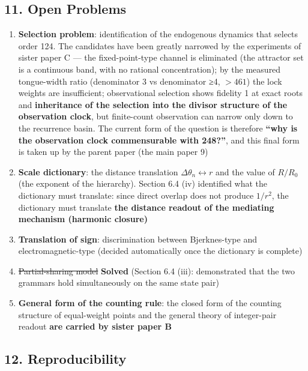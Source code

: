\documentclass[
  a4paper,
]{article}
\providecommand{\tightlist}{%
  \setlength{\itemsep}{0pt}\setlength{\parskip}{0pt}}
\begin{document}
\subsection{11. Open Problems}\label{open-problems}

\begin{enumerate}
\def\labelenumi{\arabic{enumi}.}
\tightlist
\item
  \textbf{Selection problem}: identification of the endogenous dynamics
  that selects order 124. The candidates have been greatly narrowed by
  the experiments of sister paper C --- the fixed-point-type channel is
  eliminated (the attractor set is a continuous band, with no rational
  concentration); by the measured tongue-width ratio (denominator 3 vs
  denominator ≥4, \(>461\)) the lock weights are insufficient;
  observational selection shows fidelity 1 at exact roots and
  \textbf{inheritance of the selection into the divisor structure of the
  observation clock}, but finite-count observation can narrow only down
  to the recurrence basin. The current form of the question is therefore
  \textbf{``why is the observation clock commensurable with 248?''}, and
  this final form is taken up by the parent paper (the main paper 9)
\item
  \textbf{Scale dictionary}: the distance translation
  \(\Delta\theta_n\leftrightarrow r\) and the value of \(R/R_0\) (the
  exponent of the hierarchy). Section 6.4 (iv) identified what the
  dictionary must translate: since direct overlap does not produce
  \(1/r^2\), the dictionary must translate \textbf{the distance readout
  of the mediating mechanism (harmonic closure)}
\item
  \textbf{Translation of sign}: discrimination between Bjerknes-type and
  electromagnetic-type (decided automatically once the dictionary is
  complete)
\item
  \st{Partial-sharing model} \textbf{Solved} (Section 6.4 (iii):
  demonstrated that the two grammars hold simultaneously on the same
  state pair)
\item
  \textbf{General form of the counting rule}: the closed form of the
  counting structure of equal-weight points and the general theory of
  integer-pair readout \textbf{are carried by sister paper B}
\end{enumerate}

\subsection{12. Reproducibility}\label{reproducibility}
\end{document}
